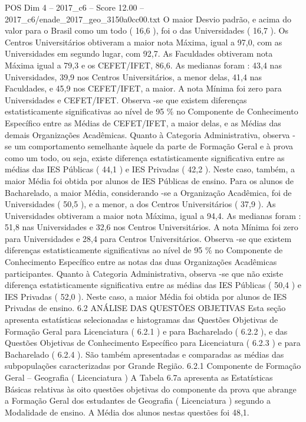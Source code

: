 \begin{textsample}{POS Dim 4 – 2017\_c6 – Score 12.00 – 2017\_c6/enade\_2017\_geo\_3150a0cc00.txt}
O maior Desvio padrão, e acima do valor para o Brasil como um todo ( 16,6 ), foi o das Universidades ( 16,7 ).
Os Centros Universitários obtiveram a maior nota Máxima, igual a 97,0, com as Universidades em segundo lugar, com 92,7.
As Faculdades obtiveram nota Máxima igual a 79,3 e os CEFET/IFET, 86,6.
As medianas foram : 43,4 nas Universidades, 39,9 nos Centros Universitários, a menor delas, 41,4 nas Faculdades, e 45,9 nos CEFET/IFET, a maior.
A nota Mínima foi zero para Universidades e CEFET/IFET.
Observa -se que existem diferenças estatisticamente significativas ao nível de 95 \% no Componente de Conhecimento Específico entre as Médias de CEFET/IFET, a maior delas, e as Médias das demais Organizações Acadêmicas.
Quanto à Categoria Administrativa, observa -se um comportamento semelhante àquele da parte de Formação Geral e à prova como um todo, ou seja, existe diferença estatisticamente significativa entre as médias das IES Públicas ( 44,1 ) e IES Privadas ( 42,2 ).
Neste caso, também, a maior Média foi obtida por alunos de IES Públicas de ensino.
Para os alunos de Bacharelado, a maior Média, considerando -se a Organização Acadêmica, foi de Universidades ( 50,5 ), e a menor, a dos Centros Universitários ( 37,9 ).
As Universidades obtiveram a maior nota Máxima, igual a 94,4.
As medianas foram : 51,8 nas Universidades e 32,6 nos Centros Universitários.
A nota Mínima foi zero para Universidades e 28,4 para Centros Universitários.
Observa -se que existem diferenças estatisticamente significativas ao nível de 95 \% no Componente de Conhecimento Específico entre as notas das duas Organizações Acadêmicas participantes.
Quanto à Categoria Administrativa, observa -se que não existe diferença estatisticamente significativa entre as médias das IES Públicas ( 50,4 ) e IES Privadas ( 52,0 ).
Neste caso, a maior Média foi obtida por alunos de IES Privadas de ensino. 6.2 ANÁLISE DAS QUESTÕES OBJETIVAS Esta seção apresenta estatísticas selecionadas e histogramas das Questões Objetivas de Formação Geral para Licenciatura ( 6.2.1 ) e para Bacharelado ( 6.2.2 ), e das Questões Objetivas de Conhecimento Específico para Licenciatura ( 6.2.3 ) e para Bacharelado ( 6.2.4 ).
São também apresentadas e comparadas as médias das subpopulações caracterizadas por Grande Região. 6.2.1 Componente de Formação Geral – Geografia ( Licenciatura ) A Tabela 6.7a apresenta as Estatísticas Básicas relativas às oito questões objetivas do componente da prova que abrange a Formação Geral dos estudantes de Geografia ( Licenciatura ) segundo a Modalidade de ensino.
A Média dos alunos nestas questões foi 48,1.

\end{textsample}

